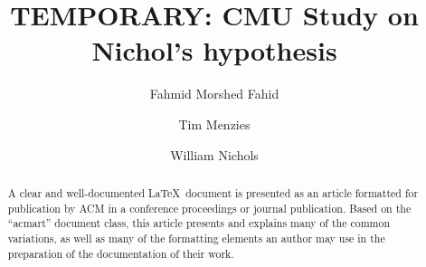 \documentclass[sigconf,review]{acmart}
\begin{document}
\title{TEMPORARY: CMU Study on Nichol's hypothesis}

\author{Fahmid Morshed Fahid}

\author{Tim Menzies}
\authornotemark[1]

\author{William Nichols}
\authornotemark[1]

\renewcommand{\shortauthors}{Fahmid et al.}
\newcommand{\quart}[4]{\begin{picture}(150,1)%
{\color{black}\put(\numexpr #3 * 6  \relax,3){\circle*{4}}\put(\numexpr #1*6 \relax ,3){\line(1,0){\numexpr #2*6 \relax}}}\end{picture}}

\setlength{\tabcolsep}{2pt}
\begin{abstract}
  A clear and well-documented \LaTeX\ document is presented as an
  article formatted for publication by ACM in a conference proceedings
  or journal publication. Based on the ``acmart'' document class, this
  article presents and explains many of the common variations, as well
  as many of the formatting elements an author may use in the
  preparation of the documentation of their work.
\end{abstract}
\end{document}

